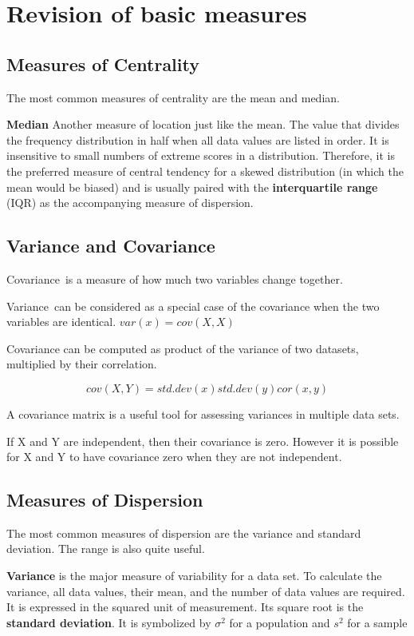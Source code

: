 \documentclass[12pt, a4paper]{report}
\begin{document}
\section{Revision of basic measures}

\subsection{Measures of Centrality}
The most common measures of centrality are the mean and median.

\textbf{Median} Another measure of location just like the mean. The value that divides the frequency distribution in half when all data values are listed in order. It is insensitive to small numbers of extreme scores in a distribution. Therefore, it is the preferred measure of central tendency for a skewed distribution (in which the mean would be biased) and is usually paired with the \textbf{interquartile range} (IQR) as the accompanying measure of dispersion.

\subsection{Variance and Covariance}
Covariance is a measure of how much two variables change together. 

Variance can be considered as a special case of the covariance when the two variables are identical.
$var(x) = cov(X,X)$

Covariance can be computed as product of the variance of two datasets, multiplied by their correlation.

\[
cov(X,Y) = std.dev (x) std.dev(y) cor(x,y)
\]

A covariance matrix is a useful tool for assessing variances in multiple data sets.


If X and Y are independent, then their covariance is zero. However it is possible for X and Y to have covariance zero when they are not independent.






\subsection{Measures of Dispersion}

The most common measures of dispersion are the variance and standard deviation. The range is also quite useful.

\textbf{Variance} is the major measure of variability for a data set. To calculate the variance, all data values, their mean, and the number of data values are required. It is expressed in the squared unit of measurement. Its square root is the \textbf{standard deviation}. It is symbolized by $\sigma^2$ for a population and $s^2$ for a sample
\end{document}
